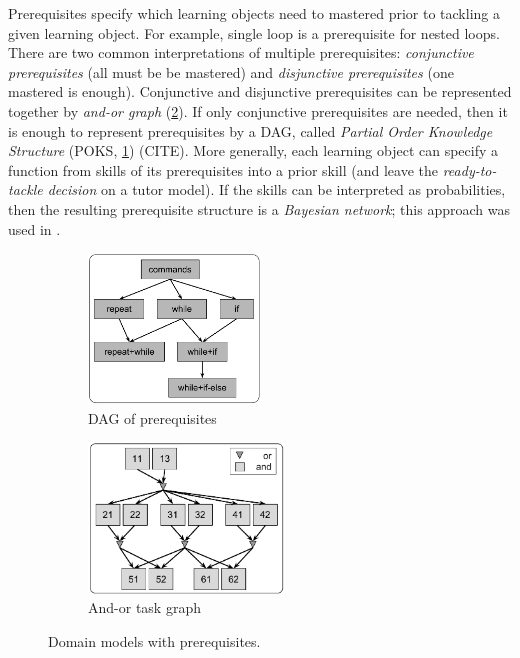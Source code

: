Prerequisites specify which learning objects need to mastered prior to
tackling a given learning object.
For example, single loop is a prerequisite for nested loops.
There are two common interpretations of multiple prerequisites:
\emph{conjunctive prerequisites} (all must be be mastered)
and \emph{disjunctive prerequisites} (one mastered is enough).
Conjunctive and disjunctive prerequisites can be represented together by
\emph{and-or graph} (\cref{fig:prerequisites-and-or}).
If only conjunctive prerequisites are needed, then it is enough to represent
prerequisites by a DAG, called \emph{Partial Order Knowledge Structure}
(POKS, \cref{fig:prerequisites-poks}) (CITE).
More generally, each learning object can specify a function from skills of
its prerequisites
into a prior skill (and leave the \emph{ready-to-tackle decision} on a tutor model).
If the skills can be interpreted as probabilities, then the resulting prerequisite structure
is a \emph{Bayesian network}; this approach was used in \cite{its-programming}.


\begin{figure}[htb]
\centering
\begin{subfigure}[t]{0.45\textwidth}
\centering
\includegraphics[height=40mm]{img/prerequisites-poks}
\caption{DAG of prerequisites}
\label{fig:prerequisites-poks}
\end{subfigure}%
\begin{subfigure}[t]{0.55\textwidth}
\centering
\includegraphics[height=40mm]{img/prerequisites-and-or}
\caption{And-or task graph}
\label{fig:prerequisites-and-or}
\end{subfigure}
\caption{Domain models with prerequisites.}
\label{fig:chunks-prerequisites}
\end{figure}

